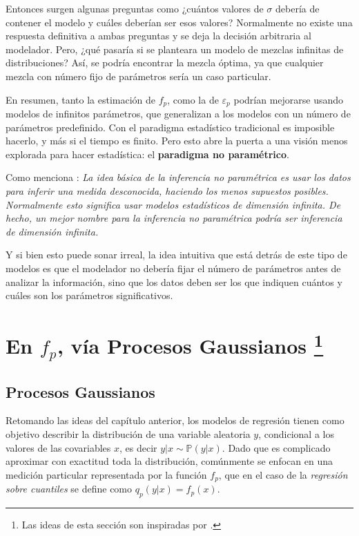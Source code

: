 Entonces surgen algunas preguntas como ¿cu\'antos valores de $\sigma$ deber\'ia de contener el modelo y cu\'ales deber\'ian ser esos valores? Normalmente no existe una respuesta definitiva a ambas preguntas y se deja la decisi\'on arbitraria al modelador. Pero, ¿qu\'e pasar\'ia si se planteara un modelo de mezclas infinitas de distribuciones? As\'i, se podr\'ia encontrar la mezcla \'optima, ya que cualquier mezcla con n\'umero fijo de par\'ametros ser\'ia un caso particular.

En resumen, tanto la estimaci\'on de $f_p$, como la de $\varepsilon_p$ podr\'ian mejorarse usando modelos de infinitos par\'ametros, que generalizan a los modelos con un n\'umero de par\'ametros predefinido. Con el paradigma estad\'istico tradicional es imposible hacerlo, y m\'as si el tiempo es finito. Pero esto abre la puerta a una visi\'on menos explorada para hacer estad\'istica: el \textbf{paradigma no param\'etrico}.

Como menciona \cite{Wasserman_Nonparametric}: \textit{La idea b\'asica de la inferencia no param\'etrica es usar los datos para inferir una medida desconocida, haciendo los menos supuestos posibles. Normalmente esto significa usar modelos estad\'isticos de dimensi\'on infinita. De hecho, un mejor nombre para la inferencia no param\'etrica podr\'ia ser inferencia de dimensi\'on infinita.}

Y si bien esto puede sonar irreal, la idea intuitiva que est\'a detr\'as de este tipo de modelos es que el modelador no deber\'ia fijar el n\'umero de par\'ametros antes de analizar la informaci\'on, sino que los datos deben ser los que indiquen cu\'antos y cu\'ales son los par\'ametros significativos.

\section[En $f_p$, v\'ia Procesos Gaussianos]{
    En $f_p$, v\'ia Procesos Gaussianos
    \footnote{Las ideas de esta secci\'on son inspiradas por \cite{Rasmussen_GauProc}.}
}

\subsection{Procesos Gaussianos}

Retomando las ideas del cap\'itulo anterior, los modelos de regresi\'on tienen como objetivo describir la distribuci\'on de una variable aleatoria $y$, condicional a los valores de las covariables $x$, es decir $y|x \sim \mathbb{P}(y|x)$. Dado que es complicado aproximar con exactitud toda la distribuci\'on, com\'unmente se enfocan en una medici\'on particular representada por la funci\'on $f_p$, que en el caso de la \textit{regresi\'on sobre cuantiles} se define como $q_p(y|x) = f_p(x)$.

